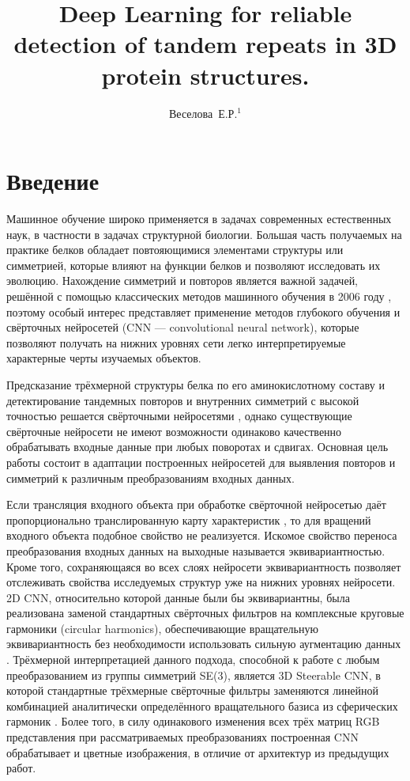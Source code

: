 \documentclass[12pt,twosides]{article}
\title
[Detection of tandem repeats in proteins]
{Deep Learning for reliable detection of tandem repeats in 3D protein structures.}
\author
[Веселова~Е.Р.] 
{Веселова~Е.Р.$^1$}
\begin{document}
	\maketitle
	
	\section{Введение}
	Машинное обучение широко применяется в задачах современных естественных наук, в частности в задачах структурной биологии. Большая часть получаемых на практике белков обладает повтояющимися элементами структуры или симметрией, которые влияют на функции белков и позволяют исследовать их эволюцию. Нахождение симметрий и повторов является важной задачей, решённой с помощью классических методов машинного обучения в 2006 году \cite{MitGuiPau06}, поэтому особый интерес представляет применение методов глубокого обучения и свёрточных нейросетей (CNN --- convolutional neural network), которые позволяют получать на нижних уровнях сети легко интерпретируемые характерные черты изучаемых объектов. 
	
	Предсказание трёхмерной структуры белка по его аминокислотному составу \cite{BioCNN18} и детектирование тандемных повторов и внутренних симметрий с высокой точностью решается свёрточными нейросетями \cite{DeepSymmetry18}, однако существующие свёрточные нейросети не имеют возможности одинаково качественно обрабатывать входные данные при любых поворотах и сдвигах. Основная цель работы состоит в адаптации построенных нейросетей для выявления повторов и симметрий к различным преобразованиям входных данных. 
	
	Если трансляция входного объекта при обработке свёрточной нейросетью даёт пропорционально транслированную карту характеристик \cite{Lenc18}, то для вращений входного объекта подобное свойство не реализуется. Искомое свойство переноса преобразования входных данных на выходные называется эквивариантностью. Кроме того, сохраняющаяся во всех слоях нейросети эквивариантность позволяет отслеживать свойства исследуемых структур уже на нижних уровнях нейросети. 2D CNN, относительно которой данные были бы эквивариантны, была реализована заменой стандартных свёрточных фильтров на комплексные круговые гармоники (circular harmonics), обеспечивающие вращательную эквивариантность без необходимости использовать сильную аугментацию данных \cite{conf/cvpr/WorrallGTB17}. Трёхмерной интерпретацией данного подхода, способной к работе с любым преобразованием из группы симметрий SE(3), является 3D Steerable CNN, в которой стандартные трёхмерные свёрточные фильтры заменяются линейной комбинацией аналитически определённого вращательного базиса из сферических гармоник \cite{DBLP:journals/corr/abs-1807-02547}. Более того, в силу одинакового изменения всех трёх матриц RGB представления при рассматриваемых преобразованиях построенная CNN обрабатывает и цветные изображения, в отличие от архитектур из предыдущих работ. 
	
\end{document}
